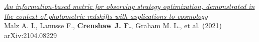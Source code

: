 \begin{etaremune}
\item \href{https://ui.adsabs.harvard.edu/abs/2021arXiv210408229M}{\textit{An information-based metric for observing strategy optimization, demonstrated in the context of photometric redshifts with applications to cosmology}} \\ 
Malz A. I., Lanusse F., \textbf{Crenshaw J. F.}, Graham M. L., et al. (2021) 
arXiv:2104.08229 

\end{etaremune}



